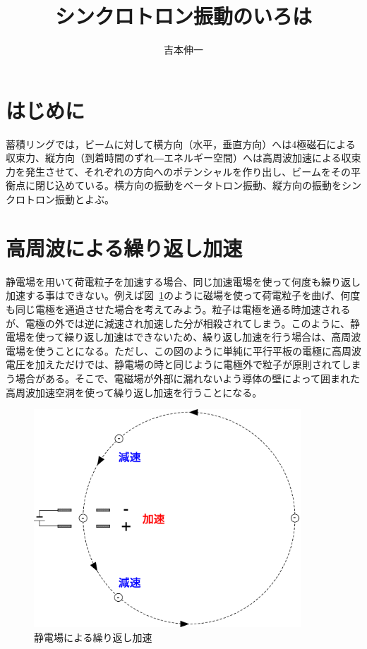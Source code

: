 \documentclass[10pt,a4paper]{ltjsarticle}
\begin{document}
\title{シンクロトロン振動のいろは}
\author{吉本伸一}
\maketitle
\tableofcontents
\clearpage

\section{はじめに}
蓄積リングでは，ビームに対して横方向（水平，垂直方向）へは4極磁石による収束力、縦方向（到着時間のずれ―エネルギー空間）へは高周波加速による収束力を発生させて、それぞれの方向へのポテンシャルを作り出し、ビームをその平衡点に閉じ込めている。横方向の振動をベータトロン振動、縦方向の振動をシンクロトロン振動とよぶ。


\section{高周波による繰り返し加速}
静電場を用いて荷電粒子を加速する場合、同じ加速電場を使って何度も繰り返し加速する事はできない。例えば図~\ref{dc_acc}のように磁場を使って荷電粒子を曲げ、何度も同じ電極を通過させた場合を考えてみよう。粒子は電極を通る時加速されるが、電極の外では逆に減速され加速した分が相殺されてしまう。このように、静電場を使って繰り返し加速はできないため、繰り返し加速を行う場合は、高周波電場を使うことになる。ただし、この図のように単純に平行平板の電極に高周波電圧を加えただけでは、静電場の時と同じように電極外で粒子が原則されてしまう場合がある。そこで、電磁場が外部に漏れないよう導体の壁によって囲まれた高周波加速空洞を使って繰り返し加速を行うことになる。

\begin{figure}[hbt]
  \begin{center}
    \includegraphics[width=10cm,clip]{dc_acc.pdf}
    \caption{静電場による繰り返し加速}
   \label{dc_acc}
  \end{center}
\end{figure}
\end{document}
